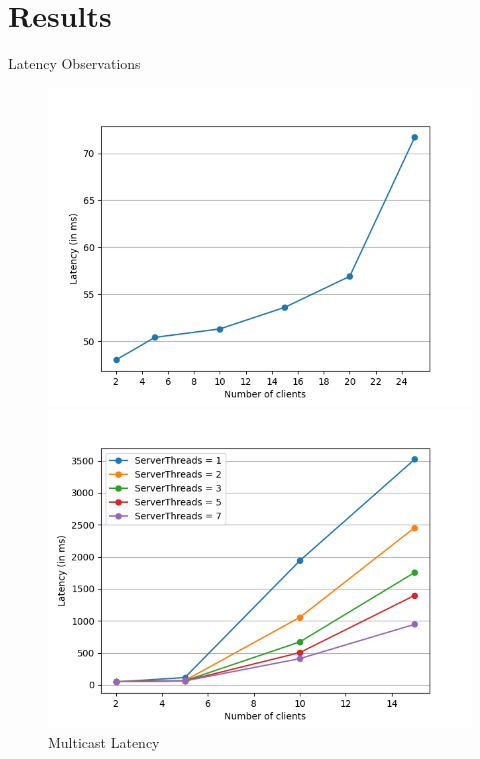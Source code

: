 \documentclass{beamer}
\begin{document}
\section{Results}
\begin{frame}{Latency Observations}
\begin{figure}[!h]
\hspace{-2cm}
\begin{minipage}[t]{5cm}
    \centering
	\includegraphics[scale=0.35]{P2P_t1}
	\caption{P2P Latency}
	\label{fig:Diagram3}
\end{minipage}
\hspace{0.5cm}
\begin{minipage}[t]{5cm}
    \centering
	\includegraphics[scale=0.35]{Room_tAll}
	\caption{Multicast Latency}
	\label{fig:Diagram4}
\end{minipage}
\end{figure}
\end{frame}
\end{document}
